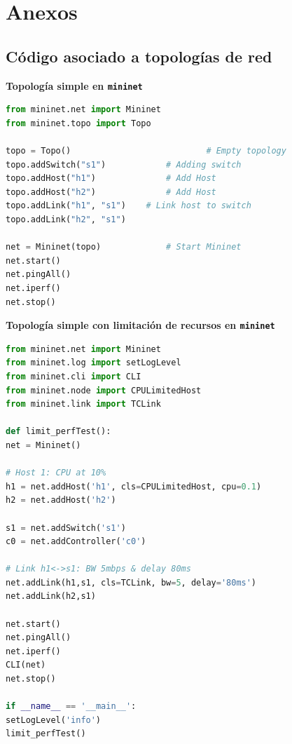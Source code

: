 \documentclass[a4paper, oneside, 12pt]{book}
\begin{document}
	\pagebreak
	
	\appendix
	
	\chapter{Anexos}
	
	\section{Código asociado a topologías de red}
	\label{sec: anexo 4}
	
	\vspace{10px}
	\noindent \textbf{\large Topología simple en \texttt{mininet}}\\
	
	\begin{lstlisting}[language=Python, caption={Código topología simple utilizando \texttt{mininet} (\texttt{basic.py})}, label={lst: topo simple}]
from mininet.net import Mininet
from mininet.topo import Topo

topo = Topo()							# Empty topology
topo.addSwitch("s1")			# Adding switch
topo.addHost("h1")				# Add Host
topo.addHost("h2")				# Add Host
topo.addLink("h1", "s1")	# Link host to switch
topo.addLink("h2", "s1")

net = Mininet(topo)				# Start Mininet
net.start()
net.pingAll()
net.iperf()
net.stop()
	\end{lstlisting}

	\vspace{20px}
	\noindent \textbf{\large Topología simple con limitación de recursos en \texttt{mininet}}\\
	\begin{lstlisting}[language=Python, caption={Código topología simple con limitación de recursos en \texttt{mininet} (\texttt{limit.py})}, label={lst: topo simple cpu mn}]
from mininet.net import Mininet
from mininet.log import setLogLevel
from mininet.cli import CLI
from mininet.node import CPULimitedHost
from mininet.link import TCLink

def limit_perfTest():
net = Mininet()

# Host 1: CPU at 10%
h1 = net.addHost('h1', cls=CPULimitedHost, cpu=0.1)		
h2 = net.addHost('h2')

s1 = net.addSwitch('s1')
c0 = net.addController('c0')

# Link h1<->s1: BW 5mbps & delay 80ms
net.addLink(h1,s1, cls=TCLink, bw=5, delay='80ms')
net.addLink(h2,s1)

net.start()
net.pingAll()
net.iperf()
CLI(net)
net.stop()

if __name__ == '__main__':
setLogLevel('info')
limit_perfTest()
	\end{lstlisting}
\end{document}
